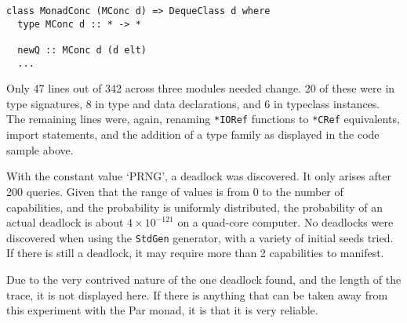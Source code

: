 \begin{verbatim}
class MonadConc (MConc d) => DequeClass d where
  type MConc d :: * -> *

  newQ :: MConc d (d elt)
  ...
\end{verbatim}

Only 47 lines out of 342 across three modules needed change. 20 of
these were in type signatures, 8 in type and data declarations, and 6
in typeclass instances. The remaining lines were, again, renaming
\verb|*IORef| functions to \verb|*CRef| equivalents, import
statements, and the addition of a type family as displayed in the code
sample above.

With the constant value `PRNG', a deadlock was discovered. It only
arises after 200 queries. Given that the range of values is from 0 to
the number of capabilities, and the probability is uniformly
distributed, the probability of an actual deadlock is about $4 \times
10^{-121}$ on a quad-core computer. No deadlocks were discovered when
using the \verb|StdGen| generator, with a variety of initial seeds
tried. If there is still a deadlock, it may require more than 2
capabilities to manifest.

Due to the very contrived nature of the one deadlock found, and the
length of the trace, it is not displayed here. If there is anything
that can be taken away from this experiment with the Par monad, it is
that it is very reliable.
